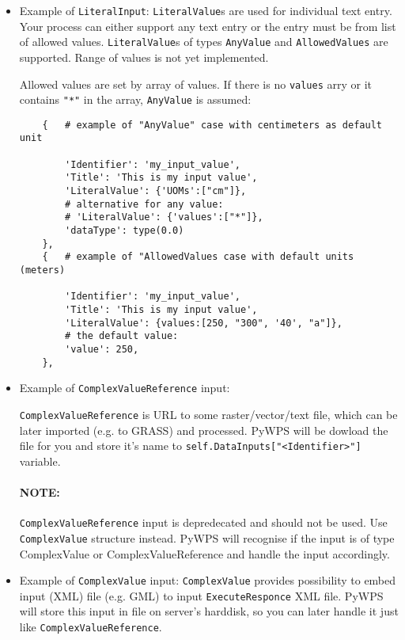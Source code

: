 \documentclass[a4paper,11pt]{article}
\begin{document}
    \begin{itemize}
        \item Example of \texttt{LiteralInput}:
        \texttt{LiteralValue}s are used for individual text entry. Your
        process can either support any text entry or the entry must be from
        list of allowed values. \texttt{LiteralValue}s of types \texttt{AnyValue} and
        \texttt{AllowedValues} are supported. Range of values is not yet
        implemented. 

        Allowed values are set by array of values. If there is no
        \texttt{values} arry or it contains \texttt{"*"}
        in the array, \texttt{AnyValue} is assumed:

    \begin{verbatim}
    {   # example of "AnyValue" case with centimeters as default unit

        'Identifier': 'my_input_value',
        'Title': 'This is my input value',
        'LiteralValue': {'UOMs':["cm"]},
        # alternative for any value:
        # 'LiteralValue': {'values':["*"]},
        'dataType': type(0.0)
    },
    {   # example of "AllowedValues case with default units (meters)

        'Identifier': 'my_input_value',
        'Title': 'This is my input value',
        'LiteralValue': {values:[250, "300", '40', "a"]},
        # the default value:
        'value': 250,
    },

    \end{verbatim}
         

        \item Example of \texttt{ComplexValueReference} input:

        \texttt{ComplexValueReference} is URL to some raster/vector/text
        file, which can be later imported (e.g. to GRASS) and processed.
        PyWPS will be dowload the file for you and store it's name to
        \texttt{self.DataInputs["<Identifier>"]} variable.

        \paragraph{NOTE:} \texttt{ComplexValueReference} input is depredecated and
        should not be used. Use \texttt{ComplexValue} structure instead.
        PyWPS will recognise if the input is of type ComplexValue or
        ComplexValueReference and handle the input accordingly.
     

        \item Example of \texttt{ComplexValue} input:
        \texttt{ComplexValue} provides possibility to embed input (XML)
        file (e.g. GML) to input \texttt{ExecuteResponce} XML file. PyWPS
        will store this input in file on server's harddisk, so you can
        later handle it just like \texttt{ComplexValueReference}.


\end{itemize}
\end{document}
